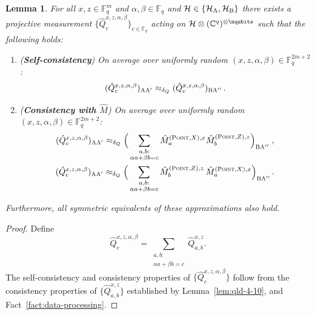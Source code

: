 \documentclass[11pt]{article}
\newtheorem{lemma}[theorem]{Lemma}
\theoremstyle{definition}
\newcommand{\C}{\ensuremath{\mathbb{C}}}
\newcommand{\F}{\ensuremath{\mathbb{F}}}
\newcommand{\mH}{\ensuremath{\mathcal{H}}}
\newcommand{\labelstyle}[1]{\ensuremath{\textsc{#1}}\xspace}
\newcommand{\alice}{\labelstyle{A}}
\newcommand{\bob}{\labelstyle{B}}
\newcommand{\typestyle}[1]{\ensuremath{\textsc{#1}}\xspace}
\newcommand{\Point}{\typestyle{Point}}
\begin{document}
\begin{lemma}\label{lem:qld-4-12}
	For all $x,z \in \F_q^m$ and $\alpha,\beta \in \F_q$ and $\mH \in \{ \mH_\alice, \mH_\bob\}$ there exists a projective measurement $\{ \hat{Q}^{x,z,\alpha,\beta}_c \}_{c \in \F_q}$ acting on $\mathcal{H} \otimes (\C^q)^{\otimes \nqubits}$ such that the following holds:
	\begin{enumerate}
		\item (\textbf{Self-consistency}) On average over uniformly random $(x,z,\alpha,\beta) \in \F_q^{2m + 2}$:
		\begin{equation}
			\label{eq:qld-4-12-self-cons}
			(\hat{Q}^{x,z,\alpha,\beta}_{c})_{\alice \alice'} \approx_{\delta_Q}  (\hat{Q}^{x,z,\alpha,\beta}_{c})_{\bob \alice''}\,.
		\end{equation}
\item (\textbf{Consistency with $\hat{M}$}) On average over uniformly random $(x,z,\alpha,\beta) \in \F_q^{2m + 2}$:
		\begin{gather}
			\label{eq:qld-4-12-cons-m-hat}
			(\hat{Q}^{x,z,\alpha,\beta}_{c})_{\alice \alice'} \approx_{\delta_Q} \Big ( \sum_{\substack{a,b: \\ \alpha a + \beta b = c}} \hat{M}^{(\Point,X),x}_{a} \hat{M}^{(\Point,Z),z}_{b} \Big )_{\bob \alice''} \;, \\
			\label{eq:qld-4-12-cons-m-hat2}
			(\hat{Q}^{x,z,\alpha,\beta}_{c})_{\alice \alice'} \approx_{\delta_Q}  \Big ( \sum_{\substack{a,b: \\ \alpha a + \beta b = c}} \hat{M}^{(\Point,Z),z}_{b} \, \hat{M}^{(\Point,X),x}_{a}  \Big )_{\bob \alice''}  \,.			
		\end{gather}
              \end{enumerate}
                    Furthermore, all symmetric equivalents of these approximations
      also hold.
\end{lemma}
\begin{proof}
	Define 
	\[
		\hat{Q}^{x,z,\alpha,\beta}_{c} = \sum_{\substack{a,b:\\ \alpha a + \beta b = c}} \hat{Q}^{x,z}_{a,b}.
	\]
	The self-consistency and consistency properties of $\{ \hat{Q}^{x,z,\alpha,\beta}_{c} \}$ follow from the consistency properties of $\{ \hat{Q}^{x,z}_{a,b} \}$ established by Lemma~\ref{lem:qld-4-10}, and Fact~\ref{fact:data-processing}. 
\end{proof}
\end{document}
